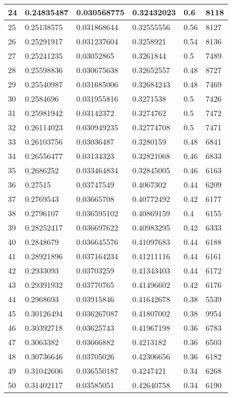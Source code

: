 \begin{longtable}{|l|l|l|l|l|l|}
24 & 0.24835487 & 0.030568775 & 0.32432023 & 0.6 & 8118 \\ \hline 
25 & 0.25138575 & 0.031868644 & 0.32555556 & 0.56 & 8127 \\ \hline 
26 & 0.25291917 & 0.031237604 & 0.3258921 & 0.54 & 8136 \\ \hline 
27 & 0.25241235 & 0.03052865 & 0.3261844 & 0.5 & 7489 \\ \hline 
28 & 0.25598836 & 0.030675638 & 0.32652557 & 0.48 & 8727 \\ \hline 
29 & 0.25540987 & 0.031685006 & 0.32684243 & 0.48 & 7469 \\ \hline 
30 & 0.2584696 & 0.031955816 & 0.3271538 & 0.5 & 7426 \\ \hline 
31 & 0.25981942 & 0.03142372 & 0.3274762 & 0.5 & 7472 \\ \hline 
32 & 0.26114023 & 0.030949235 & 0.32774708 & 0.5 & 7471 \\ \hline 
33 & 0.26103756 & 0.03036487 & 0.3280159 & 0.48 & 6841 \\ \hline 
34 & 0.26556477 & 0.03134323 & 0.32821068 & 0.46 & 6833 \\ \hline 
35 & 0.2686252 & 0.033464834 & 0.32845005 & 0.46 & 6163 \\ \hline 
36 & 0.27515 & 0.03747549 & 0.4067302 & 0.44 & 6209 \\ \hline 
37 & 0.2769543 & 0.03665708 & 0.40772492 & 0.42 & 6177 \\ \hline 
38 & 0.2796107 & 0.036595102 & 0.40869159 & 0.4 & 6155 \\ \hline 
39 & 0.28252417 & 0.036697622 & 0.40983295 & 0.42 & 6333 \\ \hline 
40 & 0.2848679 & 0.036645576 & 0.41097683 & 0.44 & 6188 \\ \hline 
41 & 0.28921896 & 0.037164234 & 0.41211116 & 0.44 & 6161 \\ \hline 
42 & 0.2933093 & 0.03703259 & 0.41343403 & 0.44 & 6172 \\ \hline 
43 & 0.29391932 & 0.03770765 & 0.41496602 & 0.42 & 6176 \\ \hline 
44 & 0.2968693 & 0.03915846 & 0.41642678 & 0.38 & 5539 \\ \hline 
45 & 0.30126494 & 0.036267087 & 0.41807002 & 0.38 & 9954 \\ \hline 
46 & 0.30392718 & 0.03625743 & 0.41967198 & 0.36 & 6783 \\ \hline 
47 & 0.3063382 & 0.03666882 & 0.4213182 & 0.36 & 6503 \\ \hline 
48 & 0.30736646 & 0.03705026 & 0.42306656 & 0.36 & 6182 \\ \hline 
49 & 0.31042606 & 0.036550187 & 0.4247421 & 0.34 & 6268 \\ \hline 
50 & 0.31402117 & 0.03585051 & 0.42640758 & 0.34 & 6190 \\ \hline 
\end{longtable}